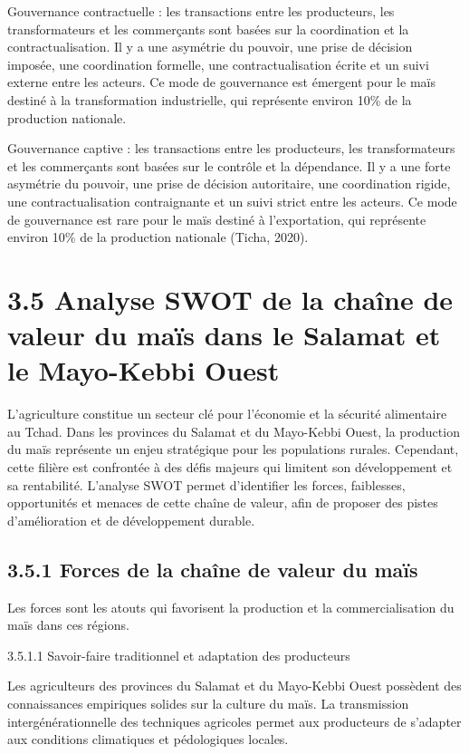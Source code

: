 \documentclass[12pt,oneside]{report}
\begin{document}
Gouvernance contractuelle : les transactions entre les producteurs, les transformateurs et les commerçants sont basées sur la coordination et la contractualisation. Il y a une asymétrie du pouvoir, une prise de décision imposée, une coordination formelle, une contractualisation écrite et un suivi externe entre les acteurs. Ce mode de gouvernance est émergent pour le maïs destiné à la transformation industrielle, qui représente environ 10\% de la production nationale.

Gouvernance captive : les transactions entre les producteurs, les transformateurs et les commerçants sont basées sur le contrôle et la dépendance. Il y a une forte asymétrie du pouvoir, une prise de décision autoritaire, une coordination rigide, une contractualisation contraignante et un suivi strict entre les acteurs. Ce mode de gouvernance est rare pour le maïs destiné à l'exportation, qui représente environ 10\% de la production nationale (Ticha, 2020).

\section{3.5 Analyse SWOT de la chaîne de valeur du maïs dans le Salamat et le Mayo-Kebbi Ouest}
L’agriculture constitue un secteur clé pour l’économie et la sécurité alimentaire au Tchad. Dans les provinces du Salamat et du Mayo-Kebbi Ouest, la production du maïs représente un enjeu stratégique pour les populations rurales. Cependant, cette filière est confrontée à des défis majeurs qui limitent son développement et sa rentabilité. L’analyse SWOT permet d’identifier les forces, faiblesses, opportunités et menaces de cette chaîne de valeur, afin de proposer des pistes d’amélioration et de développement durable.

\subsection{3.5.1 Forces de la chaîne de valeur du maïs}
Les forces sont les atouts qui favorisent la production et la commercialisation du maïs dans ces régions.

3.5.1.1 Savoir-faire traditionnel et adaptation des producteurs

Les agriculteurs des provinces du Salamat et du Mayo-Kebbi Ouest possèdent des connaissances empiriques solides sur la culture du maïs. La transmission intergénérationnelle des techniques agricoles permet aux producteurs de s’adapter aux conditions climatiques et pédologiques locales.
\end{document}
